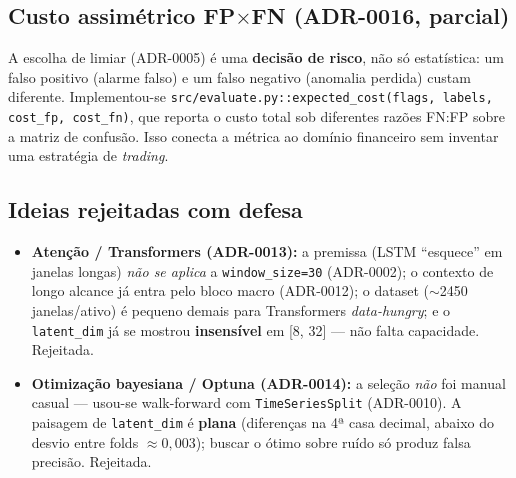 \subsection{Custo assimétrico FP$\times$FN (ADR-0016, parcial)}
\label{sec:m12-custo}
A escolha de limiar (ADR-0005) é uma \textbf{decisão de risco}, não só estatística: um falso positivo
(alarme falso) e um falso negativo (anomalia perdida) custam diferente. Implementou-se
\texttt{src/evaluate.py::expected\_cost(flags, labels, cost\_fp, cost\_fn)}, que reporta o custo total
sob diferentes razões FN:FP sobre a matriz de confusão. Isso conecta a métrica ao domínio financeiro
sem inventar uma estratégia de \emph{trading}.

\subsection{Ideias rejeitadas com defesa}
\label{sec:m12-rejeitadas}
\begin{itemize}[noitemsep]
  \item \textbf{Atenção / Transformers (ADR-0013):} a premissa (LSTM ``esquece'' em janelas longas)
        \emph{não se aplica} a \texttt{window\_size=30} (ADR-0002); o contexto de longo alcance já entra
        pelo bloco macro (ADR-0012); o dataset ($\sim$2450 janelas/ativo) é pequeno demais para
        Transformers \emph{data-hungry}; e o \texttt{latent\_dim} já se mostrou \textbf{insensível} em
        [8, 32] --- não falta capacidade. Rejeitada.
  \item \textbf{Otimização bayesiana / Optuna (ADR-0014):} a seleção \emph{não} foi manual casual ---
        usou-se walk-forward com \texttt{TimeSeriesSplit} (ADR-0010). A paisagem de \texttt{latent\_dim}
        é \textbf{plana} (diferenças na 4ª casa decimal, abaixo do desvio entre folds $\approx 0{,}003$);
        buscar o ótimo sobre ruído só produz falsa precisão. Rejeitada.
\end{itemize}

